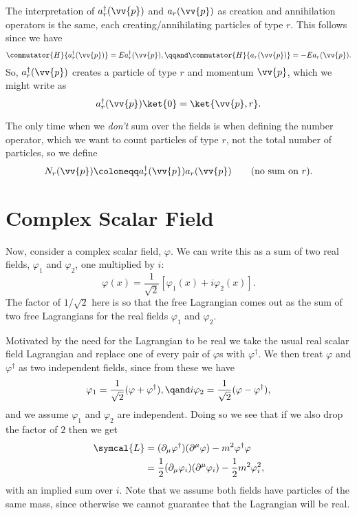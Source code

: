 \documentclass[fleqn]{NotesClass}
\newcommand{\lagrangianDensity}{\symcal{L}}
\newcommand{\hermit}{{\dagger}}
\begin{document}
    The interpretation of \(a_r^\hermit(\vv{p})\) and \(a_r(\vv{p})\) as creation and annihilation operators is the same, each creating/annihilating particles of type \(r\).
    This follows since we have
    \begin{equation}
        \commutator{H}{a_r^\hermit(\vv{p})} = Ea_r^\hermit(\vv{p}), \qqand \commutator{H}{a_r(\vv{p})} = -Ea_r(\vv{p}).
    \end{equation}
    So, \(a_r^\hermit(\vv{p})\) creates a particle of type \(r\) and momentum \(\vv{p}\), which we might write as
    \begin{equation}
        a_r^\hermit(\vv{p}) \ket{0} = \ket{\vv{p}, r}.
    \end{equation}
    
    The only time when we \emph{don't} sum over the fields is when defining the number operator, which we want to count particles of type \(r\), not the total number of particles, so we define
    \begin{equation}
        N_r(\vv{p}) \coloneqq a_r^\hermit(\vv{p}) a_r(\vv{p}) \qquad \text{(no sum on \(r\)).}
    \end{equation}
    
    \section{Complex Scalar Field}
    Now, consider a complex scalar field, \(\varphi\).
    We can write this as a sum of two real fields, \(\varphi_1\) and \(\varphi_2\), one multiplied by \(i\):
    \begin{equation}
        \varphi(x) = \frac{1}{\sqrt{2}} [\varphi_1(x) + i\varphi_2(x)].
    \end{equation}
    The factor of \(1/\sqrt{2}\) here is so that the free Lagrangian comes out as the sum of two free Lagrangians for the real fields \(\varphi_1\) and \(\varphi_2\).
    
    Motivated by the need for the Lagrangian to be real we take the usual real scalar field Lagrangian and replace one of every pair of \(\varphi\)s with \(\varphi^\hermit\).
    We then treat \(\varphi\) and \(\varphi^\hermit\) as two independent fields, since from these we have
    \begin{equation}
        \varphi_1 = \frac{1}{\sqrt{2}}(\varphi + \varphi^\hermit), \qand i\varphi_2 = \frac{1}{\sqrt{2}}(\varphi - \varphi^\hermit),
    \end{equation}
    and we assume \(\varphi_1\) and \(\varphi_2\) are independent.
    Doing so we see that if we also drop the factor of \(2\) then we get
    \begin{align}
        \lagrangianDensity &= (\partial_\mu \varphi^\hermit)(\partial^\mu \varphi) - m^2\varphi^\hermit \varphi\\
        &= \frac{1}{2}(\partial_\mu \varphi_i)(\partial^\mu \varphi_i) - \frac{1}{2}m^2\varphi_i^2,
    \end{align}
    with an implied sum over \(i\).
    Note that we assume both fields have particles of the same mass, since otherwise we cannot guarantee that the Lagrangian will be real.
    
\end{document}
